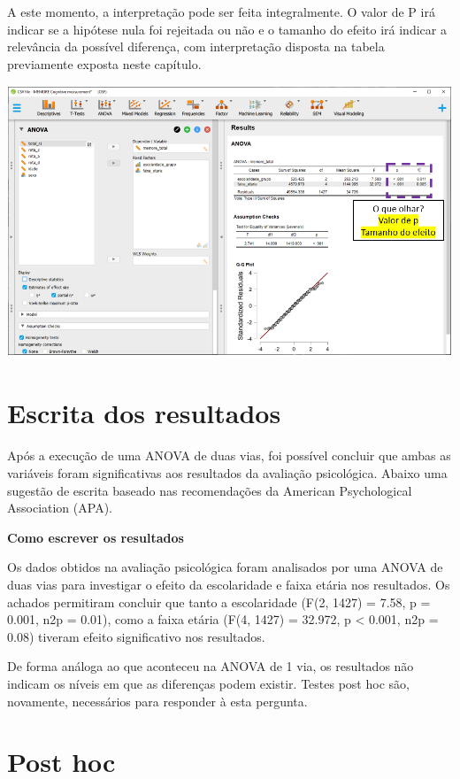 \documentclass[
]{book}
\begin{document}
A este momento, a interpretação pode ser feita integralmente. O valor de P irá indicar se a hipótese nula foi rejeitada ou não e o tamanho do efeito irá indicar a relevância da possível diferença, com interpretação disposta na tabela previamente exposta neste capítulo.

\includegraphics{./img/cap_anova_two_way_resultados_finais.png}

\hypertarget{escrita-dos-resultados-6}{%
\section{Escrita dos resultados}\label{escrita-dos-resultados-6}}

Após a execução de uma ANOVA de duas vias, foi possível concluir que ambas as variáveis foram significativas aos resultados da avaliação psicológica. Abaixo uma sugestão de escrita baseado nas recomendações da American Psychological Association (APA).

\textbf{Como escrever os resultados}

Os dados obtidos na avaliação psicológica foram analisados por uma ANOVA de duas vias para investigar o efeito da escolaridade e faixa etária nos resultados. Os achados permitiram concluir que tanto a escolaridade (F(2, 1427) = 7.58, p = 0.001, n2p = 0.01), como a faixa etária (F(4, 1427) = 32.972, p \textless{} 0.001, n2p = 0.08) tiveram efeito significativo nos resultados.

De forma análoga ao que aconteceu na ANOVA de 1 via, os resultados não indicam os níveis em que as diferenças podem existir. Testes post hoc são, novamente, necessários para responder à esta pergunta.

\hypertarget{post-hoc-1}{%
\section{Post hoc}\label{post-hoc-1}}
\end{document}
